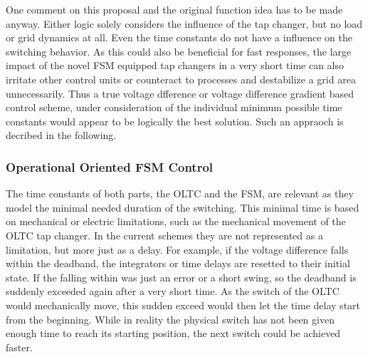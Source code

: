 One comment on this proposal and the original function idea has to be made anyway.
Either logic solely considers the influence of the tap changer, but no load or grid dynamics at all.
Even the time constants do not have a influence on the switching behavior.
As this could also be beneficial for fast responses, the large impact of the novel \acs{FSM} equipped tap changers in a very short time can also irritate other control units or counteract to processes and destabilize a grid area unnecessarily.
Thus a true voltage dfference or voltage difference gradient based control scheme, under consideration of the individual minimum possible time constants would appear to be logically the best solution.
Such an appraoch is decribed in the following.

\subsubsection{Operational Oriented FSM Control}
\label{sec:modeling-op-control}

The time constants of both parts, the \acs{OLTC} and the \acs{FSM}, are relevant as they model the minimal needed duration of the switching.
This minimal time is based on mechanical or electric limitations, such as the mechanical movement of the \acs{OLTC} tap changer.
In the current schemes they are not represented as a limitation, but more just as a delay.
For example, if the voltage difference falls within the deadband, the integrators or time delays are resetted to their initial state. 
If the falling within was just an error or a short swing, so the deadband is suddenly exceeded again after a very short time.
As the switch of the \acs{OLTC} would mechanically move, this sudden exceed would then let the time delay start from the beginning.
While in reality the physical switch has not been given enough time to reach its starting position, the next switch could be achieved faster. 

